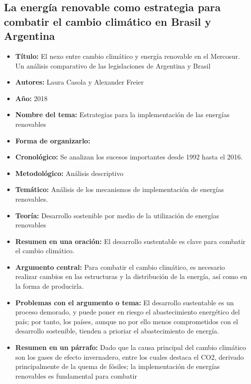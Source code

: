 \documentclass[
  letterpaper,
  DIV=11,
  numbers=noendperiod]{scrreprt}
\providecommand{\tightlist}{%
  \setlength{\itemsep}{0pt}\setlength{\parskip}{0pt}}\usepackage{longtable,booktabs,array}
\begin{document}
\subsection{La energía renovable como estrategia para combatir el cambio
climático en Brasil y
Argentina}\label{la-energuxeda-renovable-como-estrategia-para-combatir-el-cambio-climuxe1tico-en-brasil-y-argentina}

\begin{itemize}
\tightlist
\item
  \textbf{Título:} El nexo entre cambio climático y energía renovable en
  el Mercosur. Un análisis comparativo de las legislaciones de Argentina
  y Brasil
\item
  \textbf{Autores:} Laura Casola y Alexander Freier
\item
  \textbf{Año:} 2018
\item
  \textbf{Nombre del tema:} Estrategias para la implementación de las
  energías renovables
\item
  \textbf{Forma de organizarlo:}
\item
  \textbf{Cronológico:} Se analizan los sucesos importantes desde 1992
  hasta el 2016.
\item
  \textbf{Metodológico:} Análisis descriptivo
\item
  \textbf{Temático:} Análisis de los mecanismos de implementación de
  energías renovables.
\item
  \textbf{Teoría:} Desarrollo sostenible por medio de la utilización de
  energías renovables
\item
  \textbf{Resumen en una oración:} El desarrollo sustentable es clave
  para combatir el cambio climático.
\item
  \textbf{Argumento central:} Para combatir el cambio climático, es
  necesario realizar cambios en las estructuras y la distribución de la
  energía, así como en la forma de producirla.
\item
  \textbf{Problemas con el argumento o tema:} El desarrollo sustentable
  es un proceso demorado, y puede poner en riesgo el abastecimiento
  energético del país; por tanto, los países, aunque no por ello menos
  comprometidos con el desarrollo sostenible, tienden a prioriar el
  abastecimiento de energía.
\item
  \textbf{Resumen en un párrafo:} Dado que la causa principal del cambio
  climático son los gases de efecto invernadero, entre los cuales
  destaca el CO2, derivado principalmente de la quema de fósiles; la
  implementación de energías renovables es fundamental para combatir

\end{itemize}
\end{document}
